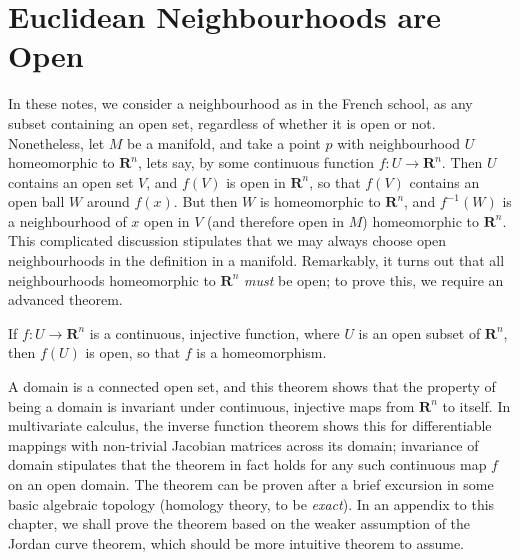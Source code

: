 \section{Euclidean Neighbourhoods are Open}

In these notes, we consider a neighbourhood as in the French school, as any subset containing an open set, regardless of whether it is open or not. Nonetheless, let $M$ be a manifold, and take a point $p$ with neighbourhood $U$ homeomorphic to $\mathbf{R}^n$, lets say, by some continuous function $f: U \to \mathbf{R}^n$. Then $U$ contains an open set $V$, and $f(V)$ is open in $\mathbf{R}^n$, so that $f(V)$ contains an open ball $W$ around $f(x)$. But then $W$ is homeomorphic to $\mathbf{R}^n$, and $f^{-1}(W)$ is a neighbourhood of $x$ open in $V$ (and therefore open in $M$) homeomorphic to $\mathbf{R}^n$. This complicated discussion stipulates that we may always choose open neighbourhoods in the definition in a manifold. Remarkably, it turns out that all neighbourhoods homeomorphic to $\mathbf{R}^n$ {\it must} be open; to prove this, we require an advanced theorem.


\begin{theorem}
    If $f:U \to \mathbf{R}^n$ is a continuous, injective function, where $U$ is an open subset of $\mathbf{R}^n$, then $f(U)$ is open, so that $f$ is a homeomorphism.
\end{theorem}

A domain is a connected open set, and this theorem shows that the property of being a domain is invariant under continuous, injective maps from $\mathbf{R}^n$ to itself. In multivariate calculus, the inverse function theorem shows this for differentiable mappings with non-trivial Jacobian matrices across its domain; invariance of domain stipulates that the theorem in fact holds for any such continuous map $f$ on an open domain. The theorem can be proven after a brief excursion in some basic algebraic topology (homology theory, to be {\it exact}). In an appendix to this chapter, we shall prove the theorem based on the weaker assumption of the Jordan curve theorem, which should be more intuitive theorem to assume.

